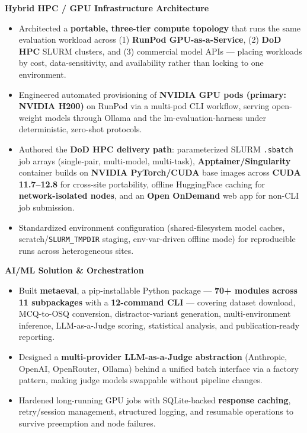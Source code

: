 \documentclass[10pt,letterpaper]{article}
\begin{document}
\textbf{Hybrid HPC / GPU Infrastructure Architecture}
\begin{itemize}
  \item Architected a \textbf{portable, three-tier compute topology} that runs the same
        evaluation workload across (1) \textbf{RunPod GPU-as-a-Service}, (2) \textbf{DoD HPC}
        SLURM clusters, and (3) commercial model APIs --- placing workloads by cost,
        data-sensitivity, and availability rather than locking to one environment.
  \item Engineered automated provisioning of \textbf{NVIDIA GPU pods (primary: NVIDIA H200)}
        on RunPod via a multi-pod CLI workflow, serving open-weight models through Ollama and
        the lm-evaluation-harness under deterministic, zero-shot protocols.
  \item Authored the \textbf{DoD HPC delivery path}: parameterized SLURM \texttt{.sbatch} job
        arrays (single-pair, multi-model, multi-task), \textbf{Apptainer/Singularity} container
        builds on \textbf{NVIDIA PyTorch/CUDA} base images across \textbf{CUDA 11.7--12.8} for
        cross-site portability, offline HuggingFace caching for \textbf{network-isolated nodes},
        and an \textbf{Open OnDemand} web app for non-CLI job submission.
  \item Standardized environment configuration (shared-filesystem model caches,
        scratch/\texttt{SLURM\_TMPDIR} staging, env-var-driven offline mode) for reproducible
        runs across heterogeneous sites.
\end{itemize}

\textbf{AI/ML Solution \& Orchestration}
\begin{itemize}
  \item Built \textbf{metaeval}, a pip-installable Python package --- \textbf{70+ modules across
        11 subpackages} with a \textbf{12-command CLI} --- covering dataset download, MCQ-to-OSQ
        conversion, distractor-variant generation, multi-environment inference, LLM-as-a-Judge
        scoring, statistical analysis, and publication-ready reporting.
  \item Designed a \textbf{multi-provider LLM-as-a-Judge abstraction} (Anthropic, OpenAI,
        OpenRouter, Ollama) behind a unified batch interface via a factory pattern, making judge
        models swappable without pipeline changes.
  \item Hardened long-running GPU jobs with SQLite-backed \textbf{response caching},
        retry/session management, structured logging, and resumable operations to survive
        preemption and node failures.
\end{itemize}
\end{document}

